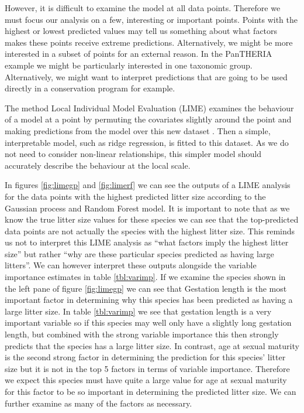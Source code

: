 \documentclass[10pt,]{article}
\begin{document}
However, it is difficult to examine the model at all data points.
Therefore we must focus our analysis on a few, interesting or important points.
Points with the highest or lowest predicted values may tell us something about what factors makes these points receive extreme predictions.
Alternatively, we might be more interested in a subset of points for an external reason.
In the PanTHERIA example we might be particularly interested in one taxonomic group.
Alternatively, we might want to interpret predictions that are going to be used directly in a conservation program for example.

The method Local Individual Model Evaluation (LIME) examines the behaviour of a model at a point by  permuting the covariates slightly around the point and making predictions from the model over this new dataset \citep{lime, ribeiro2016should, lundberg2017unified, ribeiro2016nothing}.
Then a simple, interpretable model, such as ridge regression, is fitted to this dataset.
As we do not need to consider non-linear relationships, this simpler model should accurately describe the behaviour at the local scale.

In figures \ref{fig:limegp} and \ref{fig:limerf} we can see the outputs of a LIME analysis for the data points with the highest predicted litter size according to the Gaussian process and Random Forest model.
It is important to note that as we know the true litter size values for these species we can see that the top-predicted data points are not actually the species with the highest litter size.
This reminds us not to interpret this LIME analysis as ``what factors imply the highest litter size'' but rather ``why are these particular species predicted as having large litters''.
We can however interpret these outputs alongside the variable importance estimates in table \ref{tbl:varimp}.
If we examine the species shown in the left pane of figure \ref{fig:limegp} we can see that Gestation length is the most important factor in determining why this species has been predicted as having a large litter size.
In table \ref{tbl:varimp} we see that gestation length is a very important variable so if this species may well only have a slightly long gestation length, but combined with the strong variable importance this then strongly predicts that the species has a large litter size.
In contrast, age at sexual maturity is the second strong factor in determining the prediction for this species' litter size but it is not in the top 5 factors in terms of variable importance.
Therefore we expect this species must have quite a large value for age at sexual maturity for this factor to be so important in determining the predicted litter size.
We can further examine as many of the factors as necessary.
\end{document}
